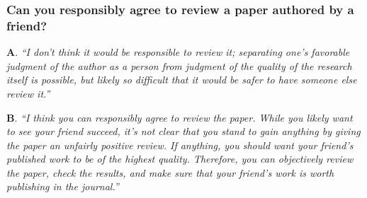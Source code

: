 \documentclass[12pt]{beamer}
\newcommand\ans[1]{{\it ``#1''}}
\newcommand\gap{\vspace{5mm}}
\begin{document}
\begin{frame} %
\frametitle{
  Can you responsibly agree to review a paper authored by a friend?
}

{\bf A}. \ans{I don’t think it would be responsible to review it; separating one’s favorable judgment of the author as a person from judgment of the quality of the research itself is possible, but likely so difficult that it would be safer to have someone else review it.}

\gap

{\bf B}. \ans{I think you can responsibly agree to review the paper.  While you likely want to see your friend succeed, it’s not clear that you stand to gain anything by giving the paper an unfairly positive review.  If anything, you should want your friend’s published work to be of the highest quality.  Therefore,  you can objectively review the paper, check the results, and make sure that your friend’s work is worth publishing in the journal.}






\end{frame}
\end{document}
